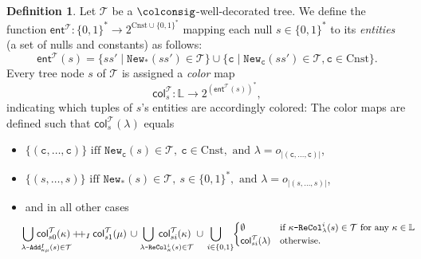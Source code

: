 \documentclass[10pt,a4paper]{amsart}
\theoremstyle{definition}
\numberwithin{equation}{section}
\theoremstyle{plain}
\theoremstyle{definition}
\newtheorem{definition}[definition]{Definition}
\theoremstyle{myexample}
\theoremstyle{plain}
\theoremstyle{definition}
\renewcommand{\vec}[1]{\boldsymbol{#1}}
\newcommand{\origcol}{o}
\newcommand{\cols}{\mathbb{L}}
\newcommand{\arity}[1]{\fcn{ar}(#1)}
\newcommand{\length}[1]{|#1|}
\newcommand{\newconst}[1]{\pred{New}_{\const{#1}}} %
\newcommand{\newanon}{\pred{New}_{\const{*}}} %
\newcommand{\cadd}[4]{#4\pred{\texttt{-}Add}^{#3}_{#1#2}} %
\newcommand{\recol}[2]{#2\pred{\texttt{-}ReCol}_{#1}}
\newcommand{\fcn}[1]{\mathsf{#1}}
\newcommand{\col}{\fcn{col}}
\newcommand{\pred}[1]{\mathtt{#1}}
\newcommand{\const}[1]{\mathtt{#1}}
\newcommand{\ve}{\vec{e}}
\newcommand{\concat}{\mathbin{{+}\hspace{-0.5ex}{+}}}
\begin{document}
\begin{definition}\label{def:entities-tree-to-instance}
Let $\mathcal{T}$ be a $\colconsig$-well-decorated tree.
We define the function $\fcn{ent}^\mathcal{T}\!:\{0,1\}^* \to 2^{\mathrm{Cnst} \cup \{0,1\}^*}$ mapping each null $s \in \{0,1\}^*$ to its \emph{entities} (a set of nulls and constants) as follows:
%
$$\fcn{ent}^\mathcal{T}\!(s) = \{ ss' \mid \newanon(ss') \in \mathcal{T}\} \cup \{ \const{c} \mid \newconst{c}(ss') \in \mathcal{T}, \const{c}\in \mathrm{Cnst}\}.$$%
%
Every tree node $s$ of $\mathcal{T}$ is assigned a \emph{color} map
$$\fcn{col}^{\mathcal{T}}_s\! \colon \cols \to 2^{(\fcn{ent}^{\mathcal{T}}\!(s))^{\ast}},$$%
indicating which tuples of $s$'s entities are accordingly colored: The color maps are defined such that $\fcn{col}^{\mathcal{T}}_{s}\!(\lambda)$ equals
\begin{itemize}
\item	
$\{ (\const{c}, \ldots, \const{c}) \}  \text{\ iff } \newconst{c}(s)\in \mathcal{T},\ \const{c}\in \mathrm{Cnst}, \text{ and } \lambda=\origcol_{|(\const{c}, \ldots, \const{c})|}$,
\item	
	$\{ (s, \ldots, s) \}  \text{\ iff } \newanon(s)\in \mathcal{T},\  s\in \{0,1\}^*, \text{ and } \lambda=\origcol_{|(s, \ldots, s)|}$,
\item and in all other cases
    \begin{align*}
	& \hspace{-10ex}\bigcup_{\hspace{8.5ex}\cadd{\kappa}{\mu}{I}{\lambda}(s)\in\mathcal{T}} \hspace{-8.5ex}\col_{s0}^{\mathcal{T}}(\kappa)\concat_{I}\col_{s1}^{\mathcal{T}}(\mu)
	\  \! \cup \! \hspace{-8ex}\bigcup_{\hspace{8.5ex}\recol{\kappa}{\lambda}^{i}(s)\in\mathcal{T}}\hspace{-8.5ex}\col_{si}^{\mathcal{T}}(\kappa)
 \ \cup \!\!\! \bigcup_{\ \ i\in \{0,1\}\!\!}
	\small
	\begin{cases}\footnotesize
		\emptyset & \text{if } \recol{\lambda}{\kappa}^{i}(s)\in\mathcal{T} \text{ for any } \kappa\in\cols \\
		\col_{si}^{\mathcal{T}}(\lambda) & \text{otherwise}.
	\end{cases}
\end{align*}
\end{itemize}
%

\end{definition}
\end{document}
